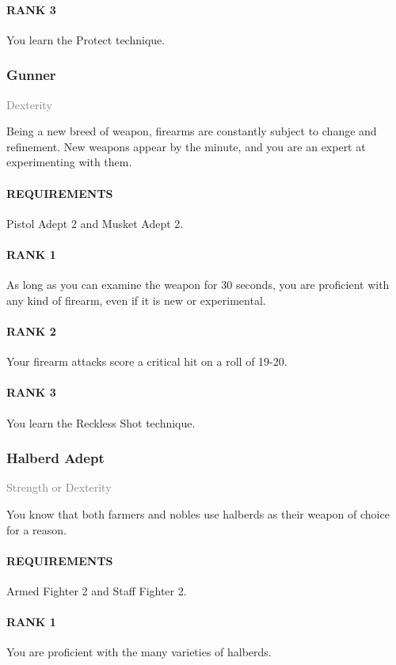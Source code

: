\paragraph{RANK 3} You learn the Protect technique.

\subsubsection{Gunner} \label{feat::gunner}
\small{\textcolor{gray}{Dexterity}}

\normalsize
Being a new breed of weapon, firearms are constantly subject to change and refinement.
New weapons appear by the minute, and you are an expert at experimenting with them.
\paragraph{REQUIREMENTS} Pistol Adept 2 and Musket Adept 2.
\paragraph{RANK 1} As long as you can examine the weapon for 30 seconds, you are proficient with any kind of firearm, even if it is new or experimental.
\paragraph{RANK 2} Your firearm attacks score a critical hit on a roll of 19-20.
\paragraph{RANK 3} You learn the Reckless Shot technique.

\subsubsection{Halberd Adept} \label{feat::halberdadept}
\small{\textcolor{gray}{Strength or Dexterity}}

\normalsize
You know that both farmers and nobles use halberds as their weapon of choice for a reason.
\paragraph{REQUIREMENTS} Armed Fighter 2 and Staff Fighter 2.
\paragraph{RANK 1} You are proficient with the many varieties of halberds.
